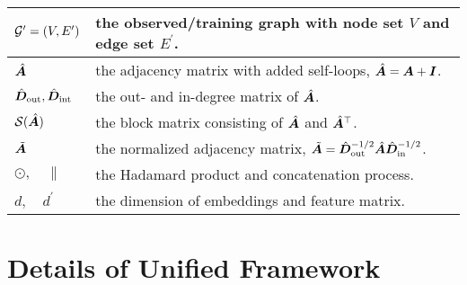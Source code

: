 \begin{table}[th]
\begin{tabular} {l|p{5.0in}}
${\mathcal{G}}^{\prime}=(V, E^{\prime})$ & the observed/training graph with node set $V$ and edge set $E^{\prime}$. \\ \midrule

$\hat{{\bm{A}}}$ & the adjacency matrix with added self-loops, $\hat{{\bm{A}}}={\bm{A}} + {\bm{I}}$. \\ \midrule

$\hat{{\bm{D}}}_{\rm out}, \hat{{\bm{D}}}_{\rm int}$ & the out- and in-degree matrix of $\hat{{\bm{A}}}$. \\ \midrule

$\mathcal{S}(\hat{{\bm{A}}})$ & the block matrix consisting of $\hat{{\bm{A}}}$ and $\hat{{\bm{A}}}^{\top}$. \\ \midrule

$\Tilde{{\bm{A}}}$ & the normalized adjacency matrix, $\Tilde{{\bm{A}}} =\hat{{\bm{D}}}_{\rm out}^{-1/2}\hat{{\bm{A}}}\hat{{\bm{D}}}_{\rm in}^{-1/2}$. \\ \midrule

$\odot, \quad \|$ & the Hadamard product and concatenation process. \\ \midrule

$d, \quad d^{\prime}$ & the dimension of embeddings and feature matrix. \\

\bottomrule
\end{tabular}
\label{notation}
\end{table}










\hypertarget{app_uni_fram}{} 
\section{Details of Unified Framework}\label{app_uni_fram}

